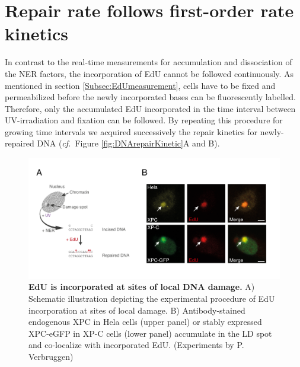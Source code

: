 \section{Repair rate follows first-order rate kinetics}
\label{firstOrderRateKinetic}
In contrast to the real-time measurements for accumulation and dissociation of the NER factors, the incorporation of EdU cannot be followed continuously. As mentioned in section \ref{Subsec:EdUmeasurement}, cells have to be fixed and permeabilized before the newly incorporated bases can be fluorescently labelled. Therefore, only the accumulated EdU incorporated in the time interval between UV-irradiation and fixation can be followed. By repeating this procedure for growing time intervals we acquired successively the repair kinetics for newly-repaired DNA (\textit{cf.}\ Figure \ref{fig:DNArepairKinetic}A and B). 
\begin{figure}[t!]
	\begin{center}
		\includegraphics[width=1\textwidth]{Abbildungen/figure2_3.pdf}
		\caption{\textbf{EdU is incorporated at sites of local DNA damage.} A) Schematic illustration depicting the experimental procedure of EdU incorporation at sites of local damage. B) Antibody-stained endogenous XPC in Hela cells (upper panel) or stably expressed XPC-eGFP in XP-C cells (lower panel) accumulate in the LD spot and co-localize with incorporated EdU. (Experiments by P. Verbruggen)}
		\label{fig:EdU_measurement}
	\end{center}
\end{figure}    
